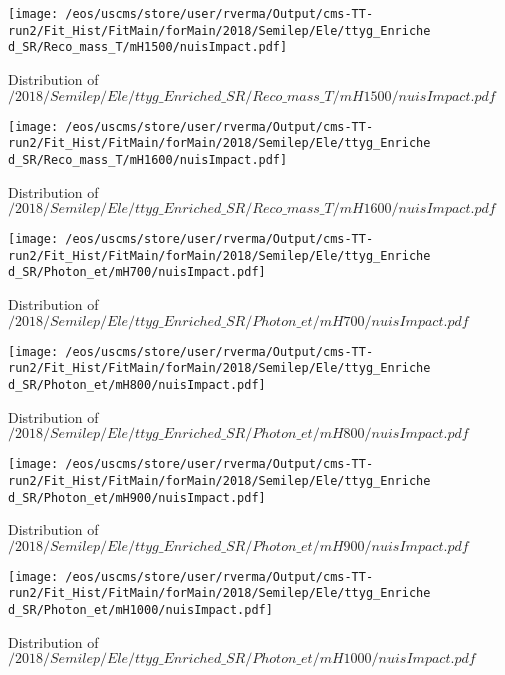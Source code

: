 \begin{figure}
\centering
\texttt{[image: /eos/uscms/store/user/rverma/Output/cms-TT-run2/Fit\_Hist/FitMain/forMain/2018/Semilep/Ele/ttyg\_Enriched\_SR/Reco\_mass\_T/mH1500/nuisImpact.pdf]}
\caption{Distribution of $/2018/Semilep/Ele/ttyg\_Enriched\_SR/Reco\_mass\_T/mH1500/nuisImpact.pdf$}
\end{figure}

\begin{figure}
\centering
\texttt{[image: /eos/uscms/store/user/rverma/Output/cms-TT-run2/Fit\_Hist/FitMain/forMain/2018/Semilep/Ele/ttyg\_Enriched\_SR/Reco\_mass\_T/mH1600/nuisImpact.pdf]}
\caption{Distribution of $/2018/Semilep/Ele/ttyg\_Enriched\_SR/Reco\_mass\_T/mH1600/nuisImpact.pdf$}
\end{figure}

\begin{figure}
\centering
\texttt{[image: /eos/uscms/store/user/rverma/Output/cms-TT-run2/Fit\_Hist/FitMain/forMain/2018/Semilep/Ele/ttyg\_Enriched\_SR/Photon\_et/mH700/nuisImpact.pdf]}
\caption{Distribution of $/2018/Semilep/Ele/ttyg\_Enriched\_SR/Photon\_et/mH700/nuisImpact.pdf$}
\end{figure}

\begin{figure}
\centering
\texttt{[image: /eos/uscms/store/user/rverma/Output/cms-TT-run2/Fit\_Hist/FitMain/forMain/2018/Semilep/Ele/ttyg\_Enriched\_SR/Photon\_et/mH800/nuisImpact.pdf]}
\caption{Distribution of $/2018/Semilep/Ele/ttyg\_Enriched\_SR/Photon\_et/mH800/nuisImpact.pdf$}
\end{figure}

\begin{figure}
\centering
\texttt{[image: /eos/uscms/store/user/rverma/Output/cms-TT-run2/Fit\_Hist/FitMain/forMain/2018/Semilep/Ele/ttyg\_Enriched\_SR/Photon\_et/mH900/nuisImpact.pdf]}
\caption{Distribution of $/2018/Semilep/Ele/ttyg\_Enriched\_SR/Photon\_et/mH900/nuisImpact.pdf$}
\end{figure}

\begin{figure}
\centering
\texttt{[image: /eos/uscms/store/user/rverma/Output/cms-TT-run2/Fit\_Hist/FitMain/forMain/2018/Semilep/Ele/ttyg\_Enriched\_SR/Photon\_et/mH1000/nuisImpact.pdf]}
\caption{Distribution of $/2018/Semilep/Ele/ttyg\_Enriched\_SR/Photon\_et/mH1000/nuisImpact.pdf$}
\end{figure}

